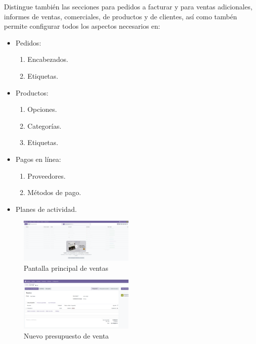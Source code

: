 \documentclass[a4paper,12pt]{article}
\begin{document}
Distingue también las secciones para pedidos a facturar y para ventas adicionales, informes de ventas, comerciales, de productos y de clientes, así como tambén permite configurar todos los aspectos necesarios en:
\begin{itemize}
    \item Pedidos:
    \begin{enumerate}
        \item Encabezados.
        \item Etiquetas.
    \end{enumerate}
    \item Productos:
    \begin{enumerate}
        \item Opciones.
        \item Categorías.
        \item Etiquetas.
    \end{enumerate}
    \item Pagos en línea:
    \begin{enumerate}
        \item Proveedores.
        \item Métodos de pago.
    \end{enumerate}
    \item Planes de actividad.
\end{itemize}

\begin{figure}[h!]
    \centering
    \includegraphics[width=0.5\textwidth]{pr2odoo40-pantallaPrincipalVentas.png}
    \caption{Pantalla principal de ventas}
\end{figure}
\FloatBarrier

\begin{figure}[h!]
    \centering
    \includegraphics[width=0.5\textwidth]{pr2odoo41-nuevoPresupuesto.png}
    \caption{Nuevo presupuesto de venta}
\end{figure}
\FloatBarrier
\end{document}

